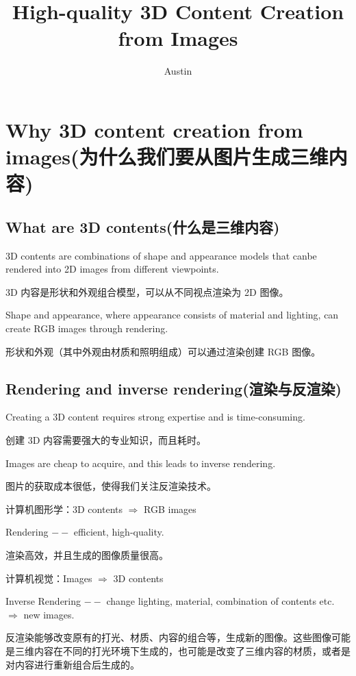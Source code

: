 \documentclass[cn,hazy,blue,14pt,screen]{elegantnote}
\title{High-quality 3D Content Creation from Images}
\author{Austin}
\institute{USTC}
\date{}
\begin{document}
	
\maketitle

\tableofcontents
	
\section{Why 3D content creation from images(为什么我们要从图片生成三维内容)}

\subsection{What are 3D contents(什么是三维内容)}

3D contents are combinations of shape and appearance models that canbe rendered into 2D images from different viewpoints.

3D 内容是形状和外观组合模型，可以从不同视点渲染为 2D 图像。

Shape and appearance, where appearance consists of material and lighting, can create RGB images through rendering.

形状和外观（其中外观由材质和照明组成）可以通过渲染创建 RGB 图像。

\subsection{Rendering and inverse rendering(渲染与反渲染)}

Creating a 3D content requires strong expertise and is time-consuming.

创建 3D 内容需要强大的专业知识，而且耗时。

Images are cheap to acquire, and this leads to inverse rendering.

图片的获取成本很低，使得我们关注反渲染技术。

计算机图形学：3D contents $\Rightarrow$ RGB images

Rendering $--$ efficient, high-quality.

渲染高效，并且生成的图像质量很高。

计算机视觉：Images $\Rightarrow$ 3D contents

Inverse Rendering $--$ change lighting, material, combination of contents etc. $\Rightarrow$ new images.

反渲染能够改变原有的打光、材质、内容的组合等，生成新的图像。这些图像可能是三维内容在不同的打光环境下生成的，也可能是改变了三维内容的材质，或者是对内容进行重新组合后生成的。
\end{document}
